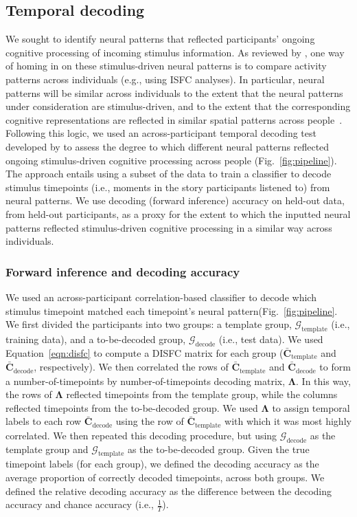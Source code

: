 \documentclass[english]{article}
\begin{document}
\subsection*{Temporal decoding}
We sought to identify neural patterns that reflected participants'
ongoing cognitive processing of incoming stimulus information.  As
reviewed by \cite{SimoEtal16}, one way of homing in on these
stimulus-driven neural patterns is to compare activity patterns across
individuals (e.g., using ISFC analyses).  In particular, neural
patterns will be similar across individuals to the extent that the
neural patterns under consideration are stimulus-driven, and to the
extent that the corresponding cognitive representations are reflected
in similar spatial patterns across people~\cite{SimoChan20}.  Following this logic, we
used an across-participant temporal decoding test developed by
\cite{MannEtal18} to assess the degree to which different neural
patterns reflected ongoing stimulus-driven cognitive processing across
people (Fig.~\ref{fig:pipeline}).  The approach entails using a subset of the data to train a
classifier to decode stimulus timepoints (i.e., moments in the story
participants listened to) from neural patterns.  We use decoding
(forward inference) accuracy on held-out data, from held-out
participants, as a proxy for the extent to which the inputted neural
patterns reflected stimulus-driven cognitive processing in a similar
way across individuals.

\subsubsection*{Forward inference and decoding accuracy}
We used an across-participant correlation-based classifier to decode
which stimulus timepoint matched each timepoint's neural pattern(Fig.~\ref{fig:pipeline}.  We
first divided the participants into two groups: a template group,
$\mathcal{G}_{\mathrm{template}}$ (i.e., training data), and a to-be-decoded group,
$\mathcal{G}_{\mathrm{decode}}$ (i.e., test data).  We used Equation~\ref{eqn:disfc} to
compute a DISFC matrix for each group
($\bar{\textbf{C}}_{\mathrm{template}}$ and
$\bar{\textbf{C}}_{\mathrm{decode}}$, respectively).  We then
correlated the rows of $\bar{\textbf{C}}_{\mathrm{template}}$ and
$\bar{\textbf{C}}_{\mathrm{decode}}$ to form a number-of-timepoints by
number-of-timepoints decoding matrix, $\mathbf{\Lambda}$.  In this
way, the rows of $\mathbf{\Lambda}$ reflected timepoints from the
template group, while the columns reflected timepoints from the
to-be-decoded group.  We used $\mathbf{\Lambda}$ to assign temporal
labels to each row $\bar{\textbf{C}}_{\mathrm{decode}}$ using the row
of $\bar{\textbf{C}}_{\mathrm{template}}$ with which it was most
highly correlated.  We then repeated this decoding procedure, but
using $\mathcal{G}_{\mathrm{decode}}$ as the template group and
$\mathcal{G}_{\mathrm{template}}$ as the to-be-decoded group.  Given
the true timepoint labels (for each group), we defined the
decoding accuracy as the average proportion of correctly
decoded timepoints, across both groups.  We defined the
relative decoding accuracy as the difference between the
decoding accuracy and chance accuracy (i.e., $\frac{1}{T}$).
\end{document}
